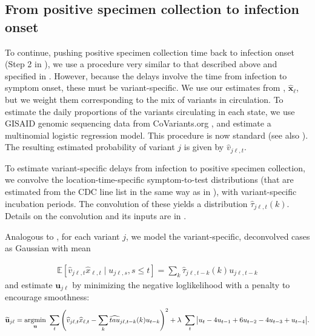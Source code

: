 \subsection{From positive specimen collection to infection onset}
\label{sec:step2-and-3}


To continue, pushing positive specimen collection time back to infection onset
(Step 2 in ), we use a procedure very
similar to that described above and specified in
. However, because
the delays involve the time from infection to symptom onset, these must be
variant-specific.
We use our estimates from ,
$\widehat{\mathbf{x}}_\ell$, but we weight them corresponding to the mix of
variants in circulation. To estimate the daily proportions of the variants
circulating in each state, we use GISAID genomic sequencing data from
CoVariants.org \citep{hodcroft2021covariants, elbe2017data}, and estimate a
multinomial logistic regression model. This procedure is now standard
\citep{obermeyer2022analysis, annavajhala2021emergence, figgins2021sars} (see
also ). The resulting
estimated probability of variant $j$ is given by $\hat{v}_{j\ell,t}$.

To estimate variant-specific delays from infection to positive specimen
collection, we convolve the location-time-specific symptom-to-test distributions
(that are estimated from the CDC line list in the same way as in
), with variant-specific incubation periods. The convolution of
these yields a distribution $\widehat{\tau}_{j\ell,t}(k)$. Details on the
convolution and its inputs are in
. 

\begin{linenomath*} 
Analogous to , for each variant $j$,
we model the variant-specific, deconvolved cases as Gaussian with mean
\end{linenomath*} 
\begin{linenomath*} 
\begin{align}
  \mathbb{E}\left[\widehat{v}_{j\ell,t}\widehat{x}_{\ell,t} \mid u_{j\ell,s}, s \leq t  \right] = \sum_k \widehat\tau_{j\ell,t-k}(k) u_{j\ell,t-k} 
\end{align}
and estimate $\mathbf{u}_{j\ell}$ by minimizing the negative loglikelihood with
a penalty to encourage smoothness:
\begin{align}
\widetilde{\mathbf{u}}_{j\ell} = \operatorname*{argmin}_{\mathbf{u}}\ \sum_{t} 
\left( 
    \widehat{v}_{j\ell,t} \widehat{x}_{\ell,t} -  
    \sum_k \widehat{tau}_{j\ell,t-k}(k) u_{t-k} 
\right)^2 
+ \lambda\ \sum_{t} \big|u_{t} - 4u_{t-1} + 6u_{t-2} -4u_{t-3}+ u_{t-4}\big|.
\end{align} 
\end{linenomath*} 

